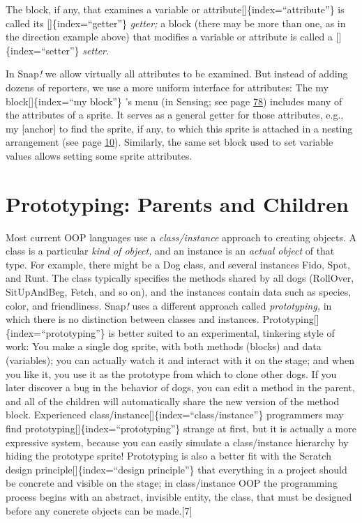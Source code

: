\documentclass[
  letterpaper,
]{book}
\begin{document}
The block, if any, that examines a variable or
attribute{[}{]}\{index=``attribute''\} is called its
{[}{]}\{index=``getter''\} \emph{getter;} a block (there may be more
than one, as in the direction example above) that modifies a variable or
attribute is called a {[}{]}\{index=``setter''\} \emph{setter.}

In Snap\emph{!} we allow virtually all attributes to be examined. But
instead of adding dozens of reporters, we use a more uniform interface
for attributes: The my block{[}{]}\{index=``my block''\} 's menu (in
Sensing; see page \hyperref[attrib.pnglist-of-attributes]{78}) includes
many of the attributes of a sprite. It serves as a general getter for
those attributes, e.g., my {[}anchor{]} to find the sprite, if any, to
which this sprite is attached in a nesting arrangement (see page
\hyperref[nesting-sprites-anchors-and-parts]{10}). Similarly, the same
set block used to set variable values allows setting some sprite
attributes.

\section{Prototyping: Parents and
Children}\label{prototyping-parents-and-children}

Most current OOP languages use a \emph{class/instance} approach to
creating objects. A class is a particular \emph{kind of object,} and an
instance is an \emph{actual object} of that type. For example, there
might be a Dog class, and several instances Fido, Spot, and Runt. The
class typically specifies the methods shared by all dogs (RollOver,
SitUpAndBeg, Fetch, and so on), and the instances contain data such as
species, color, and friendliness. Snap\emph{!} uses a different approach
called \emph{prototyping,} in which there is no distinction between
classes and instances. Prototyping{[}{]}\{index=``prototyping''\} is
better suited to an experimental, tinkering style of work: You make a
single dog sprite, with both methods (blocks) and data (variables); you
can actually watch it and interact with it on the stage; and when you
like it, you use it as the prototype from which to clone other dogs. If
you later discover a bug in the behavior of dogs, you can edit a method
in the parent, and all of the children will automatically share the new
version of the method block. Experienced
class/instance{[}{]}\{index=``class/instance''\} programmers may find
prototyping{[}{]}\{index=``prototyping''\} strange at first, but it is
actually a more expressive system, because you can easily simulate a
class/instance hierarchy by hiding the prototype sprite! Prototyping is
also a better fit with the Scratch design
principle{[}{]}\{index=``design principle''\} that everything in a
project should be concrete and visible on the stage; in class/instance
OOP the programming process begins with an abstract, invisible entity,
the class, that must be designed before any concrete objects can be
made.{[}7{]}
\end{document}
